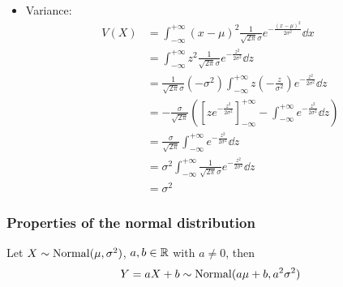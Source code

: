 \documentclass[12pt]{extarticle}
\newcommand{\Normal}{{\operatorfont Normal}}
\begin{document}
\begin{itemize}
    \item Variance:
          \begin{align}
              V(X) & = \int_{-\infty}^{+\infty} (x - \mu)^2 \frac{1}{\sqrt{2\pi} \sigma} e^{-\frac{(x-\mu)^2}{2\sigma^2}} \dd{x}                                                               \\
                   & = \int_{-\infty}^{+\infty} z^2 \frac{1}{\sqrt{2\pi} \sigma} e^{-\frac{z^2}{2\sigma^2}} \dd{z}                                                                             \\
                   & = \frac{1}{\sqrt{2\pi} \sigma}(-\sigma^2) \int_{-\infty}^{+\infty} z \left(- \frac{z}{\sigma^2}\right) e^{-\frac{z^2}{2\sigma^2}} \dd{z}                                  \\
                   & = -\frac{\sigma}{\sqrt{2\pi}} \left( \left[ z e^{-\frac{z^2}{2\sigma^2}} \right]_{-\infty}^{+\infty} - \int_{-\infty}^{+\infty} e^{-\frac{z^2}{2\sigma^2}} \dd{z} \right) \\
                   & = \frac{\sigma}{\sqrt{2\pi}} \int_{-\infty}^{+\infty} e^{-\frac{z^2}{2\sigma^2}} \dd{z}                                                                                   \\
                   & = \sigma^2 \int_{-\infty}^{+\infty} \frac{1}{\sqrt{2\pi} \sigma} e^{-\frac{z^2}{2\sigma^2}} \dd{z}                                                                        \\
                   & = \sigma^2
          \end{align}
\end{itemize}

\subsubsection{Properties of the normal distribution}


\begin{theorem}
    Let $X \sim \Normal(\mu, \sigma^2)$, $a, b \in \mathbb{R}$ with $a \neq 0$, then
    \begin{equation}
        Y = aX + b \sim \Normal(a\mu + b, a^2 \sigma^2)
    \end{equation}
\end{theorem}
\end{document}
